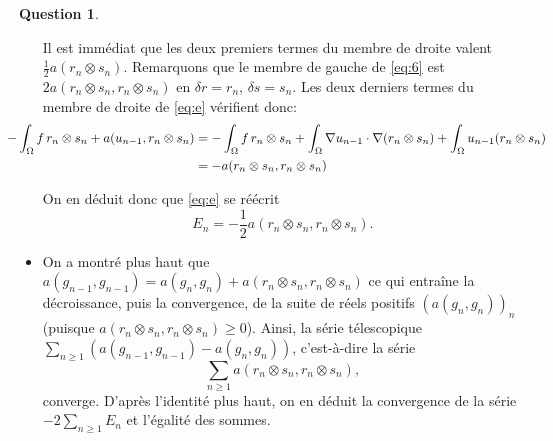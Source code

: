 \documentclass[11pt]{article}
\theoremstyle{definition}
\newtheorem{ques}{Question}
\theoremstyle{plain}
\begin{document}
\begin{ques}
\begin{itemize}
Il est immédiat que les deux premiers termes du membre de droite valent $\frac 12a(r_n\otimes s_n)$. 
Remarquons que le membre de gauche de \eqref{eq:6} est $2a(r_n\otimes s_n,r_n\otimes s_n)$ en $\delta r=r_n$, $\delta s=s_n$. Les deux derniers termes du membre de droite de \eqref{eq:e} vérifient donc:
\begin{align*}\hspace*{-1cm}
-\int_\Omega f\, r_n\otimes s_n + a(u_{n-1},r_n\otimes s_n) 
&= -\int_\Omega f\, r_n\otimes s_n + \int_\Omega \nabla u_{n-1}\cdot\nabla(r_n\otimes s_n) + \int_\Omega u_{n-1}(r_n\otimes s_n) \\
&= -a(r_n\otimes s_n,r_n\otimes s_n)
\end{align*}

On en déduit donc que \eqref{eq:e} se réécrit
\[
\boxed{E_n = -\frac 12a(r_n\otimes s_n,r_n \otimes s_n).}
\]

\item On a montré plus haut que $a(g_{n-1},g_{n-1}) = a(g_n,g_n) + a(r_n\otimes s_n,r_n\otimes s_n)$ ce qui entraîne la décroissance, puis la convergence, de la suite de réels positifs $\left(a(g_n,g_n)\right)_n$ (puisque $a(r_n\otimes s_n,r_n\otimes s_n)\geq 0$). Ainsi, la série télescopique $\sum_{n\geq 1} \left(a(g_{n-1},g_{n-1}) - a(g_n,g_n) \right)$, c'est-à-dire la série
\[
\sum_{n\geq 1} a(r_n\otimes s_n,r_n\otimes s_n),
\]
converge. D'après l'identité plus haut, on en déduit la convergence de la série $-2\sum_{n\geq 1}E_n$ et l'égalité des sommes.
\end{itemize}
\end{ques}
\end{document}
